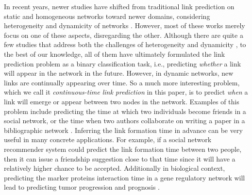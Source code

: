 In recent years, newer studies have shifted from traditional link prediction on static and homogeneous networks toward newer domains, considering heterogeneity and dynamicity of networks \cite{dong2012link, davis2011multi}. However, most of these works merely focus on one of these aspects, disregarding the other. Although there are quite a few studies that address both the challenges of heterogeneity and dynamicity \cite{aggarwal2012dynamic, sett2017temporal}, to the best of our knowledge, all of them have ultimately formulated the link prediction problem as a binary classification task, i.e., predicting \emph{whether} a link will appear in the network in the future. However, in dynamic networks, new links are continually appearing over time. So a much more interesting problem, which we call it \emph{continuous-time link prediction} in this paper, is to predict \emph{when} a link will emerge or appear between two nodes in the network. Examples of this problem include predicting the time at which two individuals become friends in a social network, or the time when two authors collaborate on writing a paper in a bibliographic network \cite{sun2012will}. Inferring the link formation time in advance can be very useful in many concrete applications. For example, if a social network recommender system could predict the link formation time between two people, then it can issue a friendship suggestion close to that time since it will have a relatively higher chance to be accepted. Additionally in biological context, predicting the marker proteins interaction time in a gene regulatory network will lead to predicting tumor progression and prognosis \cite{taylor2009dynamic}.

